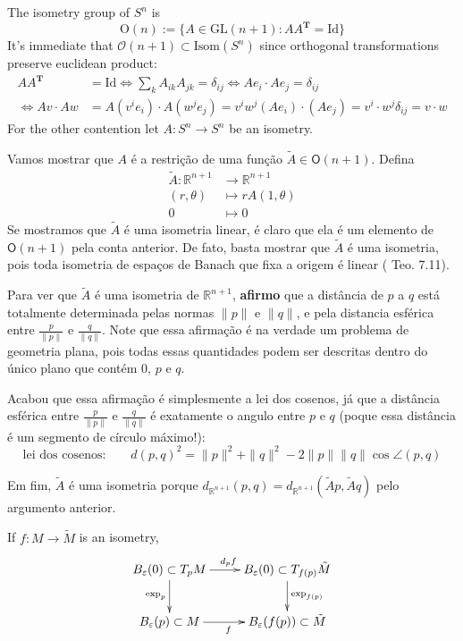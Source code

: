 \begin{example}
\label{example-isometry-group-of-Sn}
The isometry group of $S^n$ is
$$
\text{O}(n):=\{A\in\text{GL}(n+1):AA^{\mathbf{T}}=\text{Id}\}
$$
It's immediate that $\mathcal{O}(n+1)\subset \text{Isom}(S^n)$ since orthogonal
transformations preserve euclidean product:
\begin{align*}
A A^{\mathbf{T}}&=\text{Id}\iff \sum_k A_{ik}A_{jk}=\delta_{ij}
\iff Ae_i\cdot Ae_j=\delta_{ij}\\ 
\iff Av\cdot Aw&= A\left( v^ie_i\right) \cdot A\left( w^je_j\right) 
=v^iw^j (Ae_i)\cdot (Ae_j)
=v^i\cdot w^j\delta_{ij}=v\cdot w
\end{align*}
For the other contention let $A:S^n \to S^n$ be an isometry.

Vamos mostrar que $A$ é a restrição de uma função $\tilde{A} \in
\mathsf{O}(n+1)$. Defina
\begin{align*}
\tilde{A}: \mathbb{R}^{n+1} &\longrightarrow \mathbb{R}^{n+1} \\
(r,\theta) &\longmapsto rA(1,\theta)\\
0&\longmapsto 0
\end{align*}
Se mostramos que $\tilde{A}$ é uma isometria linear, é claro que ela é um
elemento de $\mathsf{O}(n+1)$ pela conta anterior. De fato, basta mostrar que
$\tilde{A}$ é uma isometria, pois toda isometria de espaços de Banach que fixa
a origem é linear (\cite{braga} Teo. 7.11).

Para ver que $\tilde{A}$ é uma isometria de $\mathbb{R}^{n+1}$,
\textbf{afirmo}  que a distância de $p$ a $q$ está totalmente determinada
pelas normas  $\|p\|$ e $\|q\|$, e pela distancia esférica entre
$\frac{p}{\|p\|}$ e $\frac{q}{\|q\|}$. Note que essa afirmação é na verdade
um problema de geometria plana, pois todas essas quantidades podem ser descritas
dentro do único plano que contém $0$, $p$ e $q$.

Acabou que essa afirmação é simplesmente a lei dos cosenos, já que a distância
esférica entre $\frac{p}{\|p\|}$ e $\frac{q}{\|q\|}$ é exatamente o angulo
entre $p$ e $q$ (poque essa distância é um segmento de círculo máximo!):
\[\text{lei dos cosenos:} \qquad d(p,q)^2=\|p\|^2+\|q\|^2-2\|p\|\|q\| \cos
\angle(p,q) \]

Em fim, $\tilde{A}$ é uma isometria porque
$d_{\mathbb{R}^{n+1}}(p,q)=d_{\mathbb{R}^{n+1}}(\tilde{A}p,\tilde{A}q)$ pelo
argumento anterior.
\end{example}


\begin{proposition}
\label{proposition-naturallity-of-exponential}
If $f:M\to \tilde{M}$ is an isometry,
$$
\xymatrix{
B_\varepsilon(0)\subset T_pM \ar[r]^{d_p f} \ar[d]_{\text{exp}_p} &
B_\varepsilon(0)\subset T_{f(p)}\tilde{M} \ar[d]^{\text{exp}_{f(p)}} \\
B_\varepsilon(p)\subset M \ar[r]_{f} & B_\varepsilon(f(p))\subset \tilde{M}
}
$$
\end{proposition}

